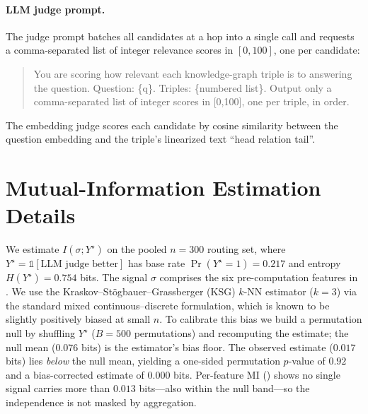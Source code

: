 \paragraph{LLM judge prompt.} The judge prompt batches all candidates at a hop into a single call and requests a comma-separated list of integer relevance scores in $[0,100]$, one per candidate:
\begin{quote}\small\ttfamily
You are scoring how relevant each knowledge-graph triple is to answering the question. Question: \{q\}. Triples: \{numbered list\}. Output only a comma-separated list of integer scores in [0,100], one per triple, in order.
\end{quote}
The embedding judge scores each candidate by cosine similarity between the question embedding and the triple's linearized text ``head relation tail''.

\section{Mutual-Information Estimation Details}
\label{app:mi}

We estimate $I(\sigma;Y^\star)$ on the pooled $n{=}300$ routing set, where $Y^\star=\mathbb{1}[\text{LLM judge better}]$ has base rate $\Pr(Y^\star{=}1)=0.217$ and entropy $H(Y^\star)=0.754$ bits. The signal $\sigma$ comprises the six pre-computation features in . We use the Kraskov--St\"ogbauer--Grassberger (KSG) $k$-NN estimator ($k{=}3$) via the standard mixed continuous--discrete formulation, which is known to be slightly positively biased at small $n$. To calibrate this bias we build a permutation null by shuffling $Y^\star$ ($B{=}500$ permutations) and recomputing the estimate; the null mean ($0.076$ bits) is the estimator's bias floor. The observed estimate ($0.017$ bits) lies \emph{below} the null mean, yielding a one-sided permutation $p$-value of $0.92$ and a bias-corrected estimate of $0.000$ bits. Per-feature MI () shows no single signal carries more than $0.013$ bits---also within the null band---so the independence is not masked by aggregation.

